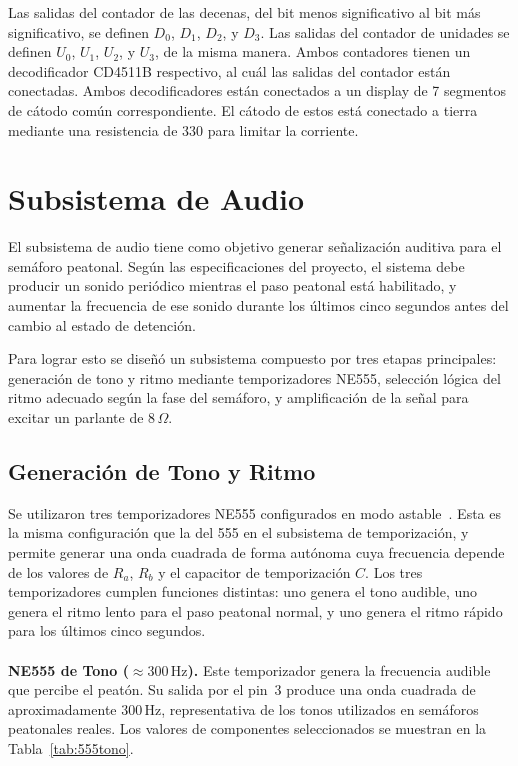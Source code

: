 \documentclass[12pt,onecolumn]{IEEEtran}
\begin{document}
Las salidas del contador de las decenas, del bit menos significativo al bit más significativo, se definen $D_0$, $D_1$, $D_2$, y $D_3$. Las salidas del contador de unidades se definen $U_0$, $U_1$, $U_2$, y $U_3$, de la misma manera. Ambos contadores tienen un decodificador CD4511B respectivo, al cuál las salidas del contador están conectadas. Ambos decodificadores están conectados a un display de 7 segmentos de cátodo común correspondiente. El cátodo de estos está conectado a tierra mediante una resistencia de \qty{330}{\Omega} para limitar la corriente. 


\section{Subsistema de Audio}

El subsistema de audio tiene como objetivo generar señalización auditiva para el semáforo peatonal. Según las especificaciones del proyecto, el sistema debe producir un sonido periódico mientras el paso peatonal está habilitado, y aumentar la frecuencia de ese sonido durante los últimos cinco segundos antes del cambio al estado de detención.

Para lograr esto se diseñó un subsistema compuesto por tres etapas principales: generación de tono y ritmo mediante temporizadores NE555, selección lógica del ritmo adecuado según la fase del semáforo, y amplificación de la señal para excitar un parlante de $8\,\Omega$.

\subsection{Generación de Tono y Ritmo}

Se utilizaron tres temporizadores NE555 configurados en modo astable~\cite{ne555art}. Esta es la misma configuración que la del 555 en el subsistema de temporización, y permite generar una onda cuadrada de forma autónoma cuya frecuencia depende de los valores de $R_a$, $R_b$ y el capacitor de temporización $C$. Los tres temporizadores cumplen funciones distintas: uno genera el tono audible, uno genera el ritmo lento para el paso peatonal normal, y uno genera el ritmo rápido para los últimos cinco segundos.
\\
\\
\textbf{NE555 de Tono ($\approx 300\,\text{Hz}$).}
Este temporizador genera la frecuencia audible que percibe el peatón. Su salida por el pin~3 produce una onda cuadrada de aproximadamente $300\,\text{Hz}$, representativa de los tonos utilizados en semáforos peatonales reales. Los valores de componentes seleccionados se muestran en la Tabla~\ref{tab:555tono}.
\end{document}
